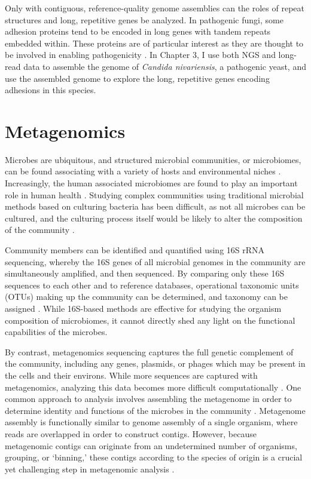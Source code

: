 Only with contiguous, reference-quality genome assemblies can the roles of repeat structures and long, repetitive genes be analyzed. In pathogenic fungi, some adhesion proteins tend to be encoded in long genes with tandem repeats embedded within. These proteins are of particular interest as they are thought to be involved in enabling pathogenicity \citep{Timmermans2018-ci}. In Chapter 3, I use both NGS and long-read data to assemble the genome of \textit{Candida nivariensis}, a pathogenic yeast, and use the assembled genome to explore the long, repetitive genes encoding adhesions in this species.

\section{Metagenomics}
\label{sec:asm}
Microbes are ubiquitous, and structured microbial communities, or microbiomes, can be found associating with a variety of hosts and environmental niches \citep{Quince2017-ay}. Increasingly, the human associated microbiomes are found to play an important role in human health \citep{Fan2021-hh}. Studying complex communities using traditional microbial methods based on culturing bacteria has been difficult, as not all microbes can be cultured, and the culturing process itself would be likely to alter the composition of the community \citep{Quince2017-ay}.

Community members can be identified and quantified using 16S rRNA sequencing, whereby the 16S genes of all microbial genomes in the community are simultaneously amplified, and then sequenced. By comparing only these 16S sequences to each other and to reference databases, operational taxonomic units (OTUs) making up the community can be determined, and taxonomy can be assigned \citep{Johnson2019-wk}. While 16S-based methods are effective for studying the organism composition of microbiomes, it cannot directly shed any light on the functional capabilities of the microbes.

By contrast, metagenomics sequencing captures the full genetic complement of the community, including any genes, plasmids, or phages which may be present in the cells and their environs. While more sequences are captured with metagenomics, analyzing this data becomes more difficult computationally \citep{Breitwieser2019-zp}. One common approach to analysis involves assembling the metagenome in order to determine identity and functions of the microbes in the community \citep{Lapidus2021-dj}. Metagenome assembly is functionally similar to genome assembly of a single organism, where reads are overlapped in order to construct contigs. However, because metagenomic contigs can originate from an undetermined number of organisms, grouping, or ‘binning,’ these contigs according to the species of origin is a crucial yet challenging step in metagenomic analysis \citep{Yue2020-cm}.

